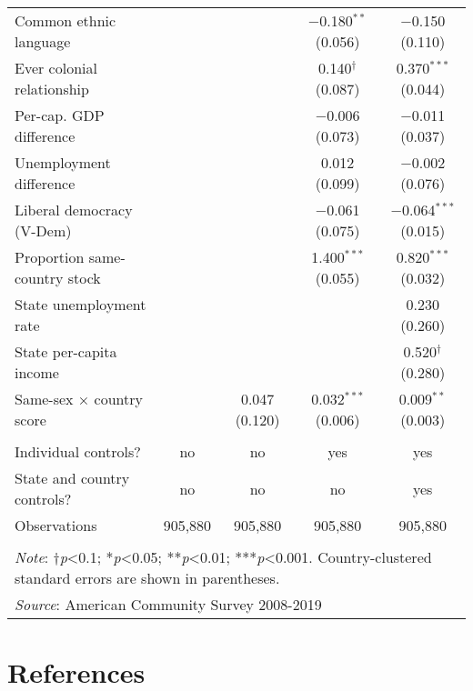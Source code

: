 \documentclass[
  11pt,
]{article}
\begin{document}
\begin{table}[H]
\begin{tabular}{@{\extracolsep{5pt}}lcccc}
  Common ethnic language &  &  & $-$0.180$^{**}$ (0.056) & $-$0.150 (0.110) \\ 
  Ever colonial relationship &  &  & 0.140$^{†}$ (0.087) & 0.370$^{***}$ (0.044) \\ 
  Per-cap. GDP difference &  &  & $-$0.006 (0.073) & $-$0.011 (0.037) \\ 
  Unemployment difference &  &  & 0.012 (0.099) & $-$0.002 (0.076) \\ 
  Liberal democracy (V-Dem) &  &  & $-$0.061 (0.075) & $-$0.064$^{***}$ (0.015) \\ 
  Proportion same-country stock &  &  & 1.400$^{***}$ (0.055) & 0.820$^{***}$ (0.032) \\ 
  State unemployment rate &  &  &  & 0.230 (0.260) \\ 
  State per-capita income &  &  &  & 0.520$^{†}$ (0.280) \\ 
  Same-sex × country score &  & 0.047 (0.120) & 0.032$^{***}$ (0.006) & 0.009$^{**}$ (0.003) \\ 
 \hline \\[-1.8ex] 
Individual controls? & no & no & yes & yes \\ 
State and country controls? & no & no & no & yes \\ 
Observations & 905,880 & 905,880 & 905,880 & 905,880 \\ 
\hline 
\hline \\[-1.8ex] 
\multicolumn{5}{l}{\parbox[t]{\textwidth}{\textit{Note}: †\textit{p}<0.1; *\textit{p}<0.05; **\textit{p}<0.01; ***\textit{p}<0.001. Country-clustered standard errors are shown in parentheses.}} \\ 
\multicolumn{5}{l}{\textit{Source}: American Community Survey 2008-2019} \\ 
\end{tabular} 
\end{table}

\newpage

\hypertarget{references}{%
\section{References}\label{references}}

\setlength{\parindent}{-0.2in}
\setlength{\leftskip}{0.2in}
\setlength{\parskip}{8pt}

\noindent
\end{document}
